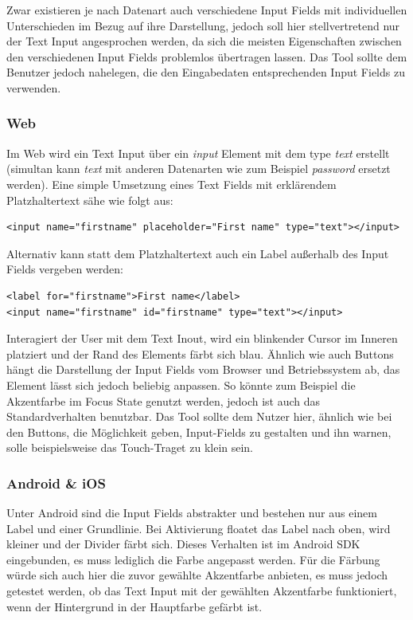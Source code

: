 Zwar existieren je nach Datenart auch verschiedene Input Fields mit individuellen Unterschieden im Bezug auf ihre Darstellung, jedoch soll hier stellvertretend nur der Text Input angesprochen werden, da sich die meisten Eigenschaften zwischen den verschiedenen Input Fields problemlos übertragen lassen. Das Tool sollte dem Benutzer jedoch nahelegen, die den Eingabedaten entsprechenden Input Fields zu verwenden.

\subsubsection{Web}
Im Web wird ein Text Input über ein \textit{input} Element mit dem type \textit{text} erstellt (simultan kann \textit{text} mit anderen Datenarten wie zum Beispiel \textit{password} ersetzt werden). Eine simple Umsetzung eines Text Fields mit erklärendem Platzhaltertext sähe wie folgt aus:

\begin{lstlisting}
<input name="firstname" placeholder="First name" type="text"></input>
\end{lstlisting}

Alternativ kann statt dem Platzhaltertext auch ein Label außerhalb des Input Fields vergeben werden:

\begin{lstlisting}
<label for="firstname">First name</label>
<input name="firstname" id="firstname" type="text"></input>
\end{lstlisting}

Interagiert der User mit dem Text Inout, wird ein blinkender Cursor im Inneren platziert und der Rand des Elements färbt sich blau.  Ähnlich wie auch Buttons hängt die Darstellung der Input Fields vom Browser und Betriebssystem ab, das Element lässt sich jedoch beliebig anpassen. So könnte zum Beispiel die Akzentfarbe im Focus State genutzt werden, jedoch ist auch das Standardverhalten benutzbar. Das Tool sollte dem Nutzer hier, ähnlich wie bei den Buttons, die Möglichkeit geben, Input-Fields zu gestalten und ihn warnen, solle beispielsweise das Touch-Traget zu klein sein.

\subsubsection{Android \& iOS}
Unter Android sind die Input Fields abstrakter und bestehen nur aus einem Label und einer Grundlinie. Bei Aktivierung floatet das Label nach oben, wird kleiner und der Divider färbt sich. Dieses Verhalten ist im Android SDK eingebunden, es muss lediglich die Farbe angepasst werden.
Für die Färbung würde sich auch hier die zuvor gewählte Akzentfarbe anbieten, es muss jedoch getestet werden, ob das Text Input mit der gewählten Akzentfarbe funktioniert, wenn der Hintergrund in der Hauptfarbe gefärbt ist.

